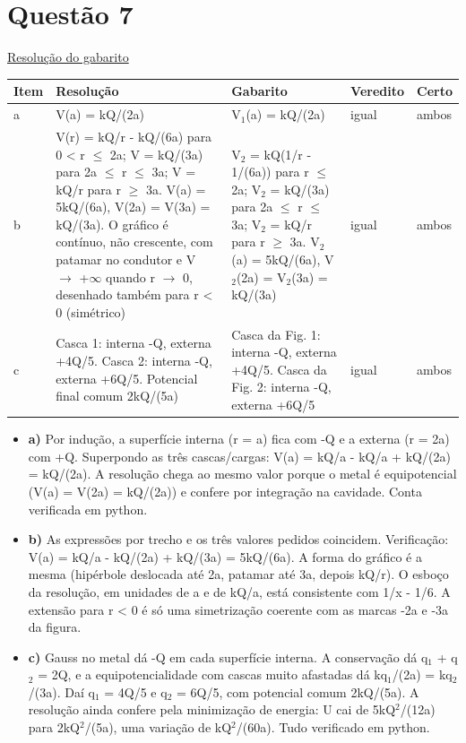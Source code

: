 \documentclass{article}%
\begin{document}
\section*{Questão 7}%
\href{https://poliedroresolve.sistemapoliedro.com.br/vestibulares/ime/2026/ime-2-fase-dia-2-24-10-2025-2-fase-dia-2/dissertativa-7-fisica-2-fase-dia-2-ime-2026}{Resolução do gabarito}\par\smallskip%
\begin{longtable}{@{}p{} p{} p{} p{} p{}@{}}\toprule Item & Resolução & Gabarito & Veredito & Certo \\ \midrule
a & V(a) = kQ/(2a) & V$_{1}$(a) = kQ/(2a) & igual & ambos \\
b & V(r) = kQ/r - kQ/(6a) para 0 < r $\leq$ 2a; V = kQ/(3a) para 2a $\leq$ r $\leq$ 3a; V = kQ/r para r $\geq$ 3a. V(a) = 5kQ/(6a), V(2a) = V(3a) = kQ/(3a). O gráfico é contínuo, não crescente, com patamar no condutor e V $\to$ +$\infty$ quando r $\to$ 0, desenhado também para r < 0 (simétrico) & V$_{2}$ = kQ(1/r - 1/(6a)) para r $\leq$ 2a; V$_{2}$ = kQ/(3a) para 2a $\leq$ r $\leq$ 3a; V$_{2}$ = kQ/r para r $\geq$ 3a. V$_{2}$(a) = 5kQ/(6a), V$_{2}$(2a) = V$_{2}$(3a) = kQ/(3a) & igual & ambos \\
c & Casca 1: interna -Q, externa +4Q/5. Casca 2: interna -Q, externa +6Q/5. Potencial final comum 2kQ/(5a) & Casca da Fig. 1: interna -Q, externa +4Q/5. Casca da Fig. 2: interna -Q, externa +6Q/5 & igual & ambos \\
\bottomrule\end{longtable}%
\begin{itemize}%
\item%
\textbf{a)} Por indução, a superfície interna (r = a) fica com -Q e a externa (r = 2a) com +Q. Superpondo as três cascas/cargas: V(a) = kQ/a - kQ/a + kQ/(2a) = kQ/(2a). A resolução chega ao mesmo valor porque o metal é equipotencial (V(a) = V(2a) = kQ/(2a)) e confere por integração na cavidade. Conta verificada em python.%
\item%
\textbf{b)} As expressões por trecho e os três valores pedidos coincidem. Verificação: V(a) = kQ/a - kQ/(2a) + kQ/(3a) = 5kQ/(6a). A forma do gráfico é a mesma (hipérbole deslocada até 2a, patamar até 3a, depois kQ/r). O esboço da resolução, em unidades de a e de kQ/a, está consistente com 1/x - 1/6. A extensão para r < 0 é só uma simetrização coerente com as marcas -2a e -3a da figura.%
\item%
\textbf{c)} Gauss no metal dá -Q em cada superfície interna. A conservação dá q$_{1}$ + q$_{2}$ = 2Q, e a equipotencialidade com cascas muito afastadas dá kq$_{1}$/(2a) = kq$_{2}$/(3a). Daí q$_{1}$ = 4Q/5 e q$_{2}$ = 6Q/5, com potencial comum 2kQ/(5a). A resolução ainda confere pela minimização de energia: U cai de 5kQ$^2$/(12a) para 2kQ$^2$/(5a), uma variação de kQ$^2$/(60a). Tudo verificado em python.%
\end{itemize}%
\end{document}

